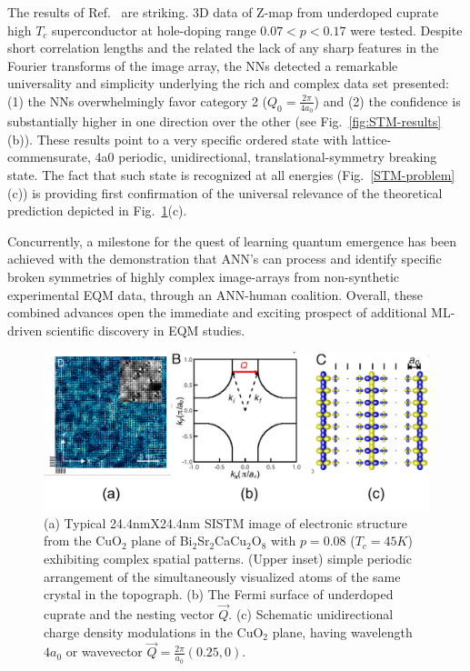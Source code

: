 \documentclass[aps,prb,floatfix,amsmath,amssymb,amsfonts,10pt,floatfix,longbibliography]{revtex4-1}
\begin{document}
\begin{enumerate}
The results of Ref.~\cite{Zhang2018} are striking. 3D data  of Z-map from underdoped cuprate high $T_c$ superconductor at hole-doping range $0.07<p<0.17$ were tested. Despite short correlation lengths and the related the lack of any sharp features in the  Fourier transforms of the image array, the NNs detected a remarkable universality and simplicity underlying the rich and complex data set presented:
(1) the NNs overwhelmingly favor category 2 ($Q_0=\frac{2\pi}{4a_0}$) and (2) the confidence is substantially higher in one direction over the other (see Fig.~\ref{fig:STM-results}(b)). These results point to 
a very specific ordered state with lattice-commensurate, 4a0 periodic, unidirectional, translational-symmetry breaking state. The fact that such state is recognized at all energies (Fig.~\ref{STM-problem}(c)) 
is providing first confirmation of the universal relevance of the theoretical prediction\cite{Zaanen1989,Loew1994, Vojta1999,White1998a,Capponi2002, Corboz2014,Fischer2014}  depicted in Fig.~\ref{fig:STM-problem}(c). 

Concurrently, a milestone for the quest of learning quantum emergence
has been achieved with the demonstration that ANN’s can process and identify specific broken symmetries of highly complex image-arrays from non-synthetic experimental EQM data, through an ANN-human coalition. Overall, these combined advances open the immediate and exciting prospect of additional ML-driven scientific discovery in EQM studies. 



\begin{figure}[t]
\includegraphics[width=\linewidth]{Figures/STM-problem.png} 
\caption{(a) Typical 24.4nmX24.4nm SISTM image of electronic structure  from the CuO$_2$ plane of Bi$_2$Sr$_2$CaCu$_2$O$_8$ with $p=0.08$ ($T_c=45K$) exhibiting complex spatial patterns. 
(Upper inset) simple periodic arrangement of the simultaneously visualized atoms of the same crystal in the topograph. 
(b) The Fermi surface of underdoped cuprate and the nesting vector $\vec{Q}$. (c) Schematic unidirectional charge density modulations in the CuO$_2$ plane, having wavelength $4a_0$ or wavevector $\vec{Q}=\frac{2\pi}{a_0}(0.25,0)$.\cite{Zhang2018}}
\label{fig:STM-problem}
\end{figure}


\end{enumerate}
\end{document}
